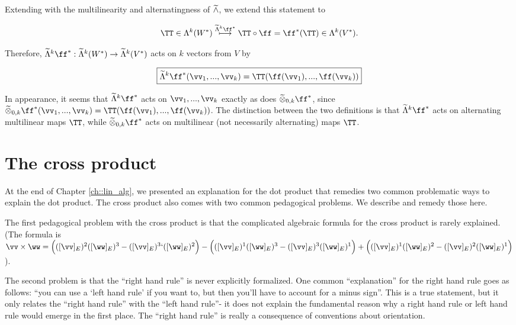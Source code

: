 \begin{deriv}
    Extending with the multilinearity and alternatingness of $\widetilde{\wedge}$, we extend this statement to
    
    \begin{align*}
        \TT \in \Lambda^k(W^*) \overset{\tLambda^k \ff^*}{\longmapsto} \TT \circ \ff = \ff^*(\TT) \in \Lambda^k(V^*).
    \end{align*}
    
    Therefore, $\tLambda^k \ff^*:\tLambda^k(W^*) \rightarrow \tLambda^k(V^*)$ acts on $k$ vectors from $V$ by
    
    \begin{align*}
        \boxed
        {
            \tLambda^k \ff^*(\vv_1, ..., \vv_k) = \TT(\ff(\vv_1), ..., \ff(\vv_k))
        }
    \end{align*}
    
    In appearance, it seems that $\tLambda^k \ff^*$ acts on $\vv_1, ..., \vv_k$ exactly as does $\totimes_{0,k} \ff^*$, since $\totimes_{0,k} \ff^*(\vv_1, ..., \vv_k) = \TT(\ff(\vv_1), ..., \ff(\vv_k))$. The distinction between the two definitions is that $\tLambda^k \ff^*$ acts on alternating multilinear maps $\TT$, while $\totimes_{0,k} \ff^*$ acts on multilinear (not necessarily alternating) maps $\TT$.
\end{deriv}

\newpage

\section{The cross product}
\label{ch::exterior_pwrs::section::cross_product}

At the end of Chapter \ref{ch::lin_alg}, we presented an explanation for the dot product that remedies two common problematic ways to explain the dot product. The cross product also comes with two common pedagogical problems. We describe and remedy those here.

The first pedagogical problem with the cross product is that the complicated algebraic formula for the cross product is rarely explained. (The formula is $\vv \times \ww = \Big( ([\vv]_E)^2 ([\ww]_E)^3 - ([\vv]_E)^3` ([\ww]_E)^2 \Big) - \Big( ([\vv]_E)^1 ([\ww]_E)^3 - ([\vv]_E)^3 ([\ww]_E)^1 \Big) + \Big( ([\vv]_E)^1 ([\ww]_E)^2 - ([\vv]_E)^2 ([\ww]_E)^1 \Big)$).

The second problem is that the ``right hand rule'' is never explicitly formalized. One common ``explanation'' for the right hand rule goes as follows: ``you can use a `left hand rule' if you want to, but then you'll have to account for a minus sign''. This is a true statement, but it only relates the ``right hand rule'' with the ``left hand rule''- it does not explain the fundamental reason why a right hand rule or left hand rule would emerge in the first place. The ``right hand rule'' is really a consequence of conventions about orientation.

